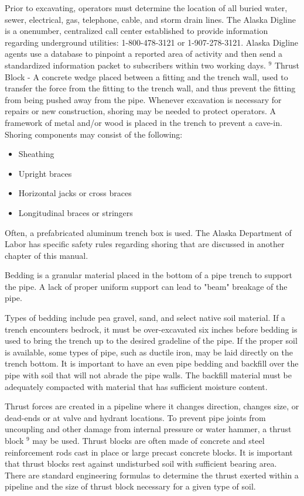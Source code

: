 \documentclass[10pt]{article}
\begin{document}
Prior to excavating, operators must determine the location of all buried water, sewer, electrical, gas, telephone, cable, and storm drain lines. The Alaska Digline is a onenumber, centralized call center established to provide information regarding underground utilities: 1-800-478-3121 or 1-907-278-3121. Alaska Digline agents use a database to pinpoint a reported area of activity and then send a standardized information packet to subscribers within two working days. ${ }^{9}$ Thrust Block - A concrete wedge placed between a fitting and the trench wall, used to transfer the force from the fitting to the trench wall, and thus prevent the fitting from being pushed away from the pipe. Whenever excavation is necessary for repairs or new construction, shoring may be needed to protect operators. A framework of metal and/or wood is placed in the trench to prevent a cave-in. Shoring components may consist of the following:

\begin{itemize}
  \item Sheathing

  \item Upright braces

  \item Horizontal jacks or cross braces

  \item Longitudinal braces or stringers

\end{itemize}
Often, a prefabricated aluminum trench box is used. The Alaska Department of Labor has specific safety rules regarding shoring that are discussed in another chapter of this manual.

Bedding is a granular material placed in the bottom of a pipe trench to support the pipe. A lack of proper uniform support can lead to "beam" breakage of the pipe.

Types of bedding include pea gravel, sand, and select native soil material. If a trench encounters bedrock, it must be over-excavated six inches before bedding is used to bring the trench up to the desired gradeline of the pipe. If the proper soil is available, some types of pipe, such as ductile iron, may be laid directly on the trench bottom. It is important to have an even pipe bedding and backfill over the pipe with soil that will not abrade the pipe walls. The backfill material must be adequately compacted with material that has sufficient moisture content.

Thrust forces are created in a pipeline where it changes direction, changes size, or dead-ends or at valve and hydrant locations. To prevent pipe joints from uncoupling and other damage from internal pressure or water hammer, a thrust block ${ }^{9}$ may be used. Thrust blocks are often made of concrete and steel reinforcement rods cast in place or large precast concrete blocks. It is important that thrust blocks rest against undisturbed soil with sufficient bearing area. There are standard engineering formulas to determine the thrust exerted within a pipeline and the size of thrust block necessary for a given type of soil.\\
\end{document}
